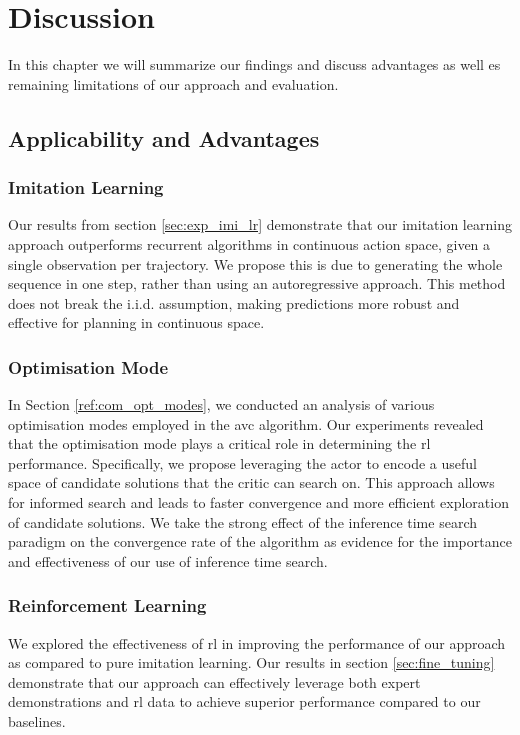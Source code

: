 
\chapter{Discussion}
\label{chapter:Discussion}
In this chapter we will summarize our findings and discuss advantages as well es remaining limitations of our approach and evaluation.
\section{Applicability and Advantages}
\subsection{Imitation Learning}
Our results from section \ref{sec:exp_imi_lr} demonstrate that our imitation learning approach outperforms recurrent algorithms in continuous action space, 
given a single observation per trajectory. We propose this is due to generating the whole sequence in one step, 
rather than using an autoregressive approach. This method does not break the i.i.d. assumption, making predictions more robust and effective 
for planning in continuous space. \\

\subsection{Optimisation Mode}
In Section \ref{ref:com_opt_modes}, we conducted an analysis of various optimisation modes employed in the \ac{avc} algorithm. 
Our experiments revealed that the optimisation mode plays a critical role in determining the \ac{rl} performance. 
Specifically, we propose leveraging the actor to encode a useful space of candidate solutions that the critic can search on. 
This approach allows for informed search and leads to faster convergence and more efficient exploration of candidate solutions. We take the strong effect of the inference time 
search paradigm on the convergence rate of the algorithm as evidence for the importance and effectiveness of our use of inference time search.

\subsection{Reinforcement Learning}
We explored the effectiveness of \ac{rl} in improving the performance of our approach as compared to pure imitation learning. 
Our results in section \ref{sec:fine_tuning} demonstrate that our approach can effectively leverage both expert demonstrations and \ac{rl} data to achieve 
superior performance compared to our baselines.\\

